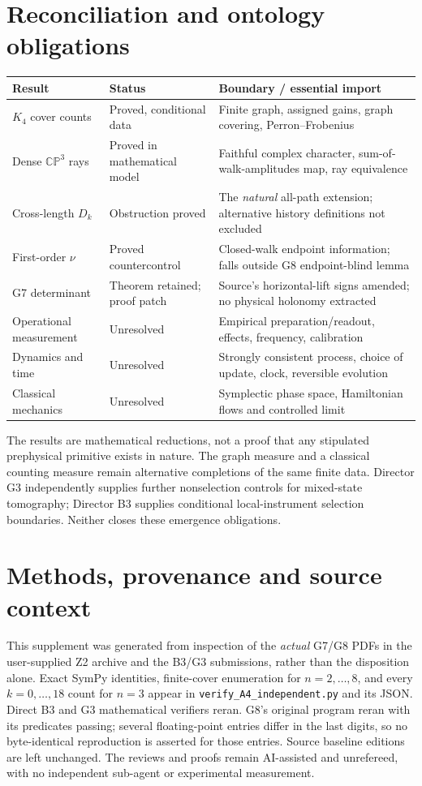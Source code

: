 \documentclass[11pt]{article}
\newcommand{\cp}{\mathbb{CP}}
\begin{document}
\section{Reconciliation and ontology obligations}
\begin{center}
\small
\begin{tabular}{p{30mm}p{35mm}p{77mm}}
\toprule
Result & Status & Boundary / essential import \\
\midrule
$K_4$ cover counts & Proved, conditional data & Finite graph, assigned gains, graph covering, Perron--Frobenius \\
Dense $\cp^3$ rays & Proved in mathematical model & Faithful complex character, sum-of-walk-amplitudes map, ray equivalence \\
Cross-length $D_k$ & Obstruction proved & The \emph{natural} all-path extension; alternative history definitions not excluded \\
First-order $\nu$ & Proved countercontrol & Closed-walk endpoint information; falls outside G8 endpoint-blind lemma \\
G7 determinant & Theorem retained; proof patch & Source's horizontal-lift signs amended; no physical holonomy extracted \\
Operational measurement & Unresolved & Empirical preparation/readout, effects, frequency, calibration \\
Dynamics and time & Unresolved & Strongly consistent process, choice of update, clock, reversible evolution \\
Classical mechanics & Unresolved & Symplectic phase space, Hamiltonian flows and controlled limit \\
\bottomrule
\end{tabular}
\end{center}
The results are mathematical reductions, not a proof that any stipulated prephysical primitive exists in nature. The graph measure and a classical counting measure remain alternative completions of the same finite data. Director G3 independently supplies further nonselection controls for mixed-state tomography; Director B3 supplies conditional local-instrument selection boundaries. Neither closes these emergence obligations.

\section*{Methods, provenance and source context}
This supplement was generated from inspection of the \emph{actual} G7/G8 PDFs in the user-supplied Z2 archive and the B3/G3 submissions, rather than the disposition alone. Exact SymPy identities, finite-cover enumeration for $n=2,\ldots,8$, and every $k=0,\ldots,18$ count for $n=3$ appear in \texttt{verify\_A4\_independent.py} and its JSON. Direct B3 and G3 mathematical verifiers reran. G8's original program reran with its predicates passing; several floating-point entries differ in the last digits, so no byte-identical reproduction is asserted for those entries. Source baseline editions are left unchanged. The reviews and proofs remain AI-assisted and unrefereed, with no independent sub-agent or experimental measurement.
\end{document}
